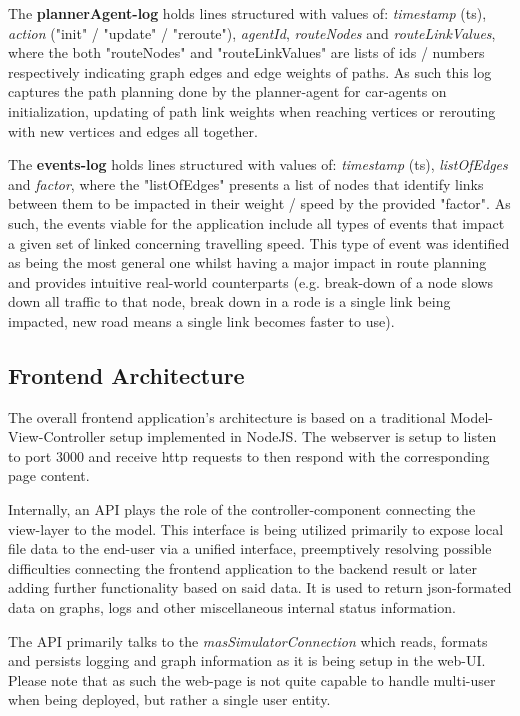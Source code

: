 The \textbf{plannerAgent-log} holds lines structured with values of: \textit{timestamp} (ts), \textit{action} ("init" / "update" / "reroute"), \textit{agentId}, \textit{routeNodes} and \textit{routeLinkValues}, where the both "routeNodes" and "routeLinkValues" are lists of ids / numbers respectively indicating graph edges and edge weights of paths. As such this log captures the path planning done by the planner-agent for car-agents on initialization, updating of path link weights when reaching vertices or rerouting with new vertices and edges all together.

The \textbf{events-log} holds lines structured with values of: \textit{timestamp} (ts), \textit{listOfEdges} and \textit{factor}, where the "listOfEdges" presents a list of nodes that identify links between them to be impacted in their weight / speed by the provided "factor".
As such, the events viable for the application include all types of events that impact a given set of linked concerning travelling speed. This type of event was identified as being the most general one whilst having a major impact in route planning and provides intuitive real-world counterparts (e.g. break-down of a node slows down all traffic to that node, break down in a rode is a single link being impacted, new road means a single link becomes faster to use).


\subsection{Frontend Architecture}\label{subsec:frontendArchitecture}

The overall frontend application's architecture is based on a traditional Model-View-Controller setup implemented in NodeJS. The webserver is setup to listen to port 3000 and receive http requests to then respond with the corresponding page content.

Internally, an API plays the role of the controller-component connecting the view-layer to the model. This interface is being utilized primarily to expose local file data to the end-user via a unified interface, preemptively resolving possible difficulties connecting the frontend application to the backend result or later adding further functionality based on said data. It is used to return json-formated data on graphs, logs and other miscellaneous internal status information.

The API primarily talks to the \textit{masSimulatorConnection} which reads, formats and persists logging and graph information as it is being setup in the web-UI.
Please note that as such the web-page is not quite capable to handle multi-user when being deployed, but rather a single user entity.

